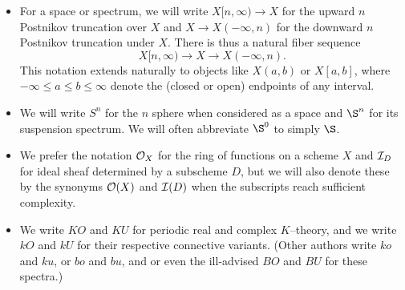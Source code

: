 \begin{itemize}
\item For a space or spectrum, we will write $X[n, \infty) \to X$ for the upward $n${\th} Postnikov truncation over $X$ and $X \to X(-\infty, n)$ for the downward $n${\th} Postnikov truncation under $X$.  There is thus a natural fiber sequence \[X[n, \infty) \to X \to X(-\infty, n).\]  This notation extends naturally to objects like $X(a, b)$ or $X[a, b]$, where $-\infty \le a \le b \le \infty$ denote the (closed or open) endpoints of any interval.
\item We will write $S^n$ for the $n${\th} sphere when considered as a space and $\S^n$ for its suspension spectrum.  We will often abbreviate $\S^0$ to simply $\S$.
\item We prefer the notation $\mathcal{O}_X$ for the ring of functions on a scheme $X$ and $\mathcal{I}_D$ for ideal sheaf determined by a subscheme $D$, but we will also denote these by the synonyms $\mathcal{O}(X)$ and $\mathcal{I}(D)$ when the subscripts reach sufficient complexity.
\item We write $KO$ and $KU$ for periodic real and complex $K$--theory, and we write $kO$ and $kU$ for their respective connective variants.  (Other authors write $ko$ and $ku$, or $bo$ and $bu$, and or even the ill-advised $BO$ and $BU$ for these spectra.)
\end{itemize}
